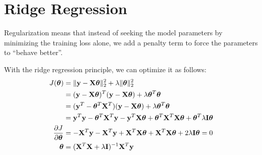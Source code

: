 \section{Ridge Regression}
Regularization means that instead of seeking the model parameters by minimizing the training loss alone, we add a penalty term to force the parameters to ``behave better''. 


With the ridge regression principle, we can optimize it as follows:
\begin{align}
	J(\boldsymbol{\theta}) &= \|\mathbf{y}-\mathbf{X}\boldsymbol{\theta}\|^2_2 + \lambda \|\boldsymbol{\theta}\|^2_2 \\
			&= (\mathbf{y}-\mathbf{X}\boldsymbol{\theta})^T(\mathbf{y}-\mathbf{X}\boldsymbol{\theta})+\lambda\boldsymbol{\theta}^T\boldsymbol{\theta}\\
			&= (\mathbf{y}^T-\boldsymbol{\theta}^T\mathbf{X}^T)(\mathbf{y}-\mathbf{X}\boldsymbol{\theta})+\lambda\boldsymbol{\theta}^T\boldsymbol{\theta}\\
			&= {\mathbf{y}}^T{\mathbf{y}}-\boldsymbol{\theta}^T\mathbf{X}^T{\mathbf{y}}-{\mathbf{y}}^T\mathbf{X}\boldsymbol{\theta}+\boldsymbol{\theta}^T\mathbf{X}^T\mathbf{X}\boldsymbol{\theta}+\boldsymbol{\theta}^T\lambda\mathbf{I}\boldsymbol{\theta}\\
	\frac{\partial J}{\partial \boldsymbol{\theta}}&= -\mathbf{X}^T{\mathbf{y}}-\mathbf{X}^T{\mathbf{y}}+\mathbf{X}^T\mathbf{X}\boldsymbol{\theta}+\mathbf{X}^T\mathbf{X}\boldsymbol{\theta}+2\lambda\mathbf{I}\boldsymbol{\theta} = 0\\
	\boldsymbol{\theta}	&= (\mathbf{X}^T\mathbf{X}+\lambda\mathbf{I})^{-1}\mathbf{X}^T{\mathbf{y}}
	\label{eq:ridge_regression}
\end{align}

